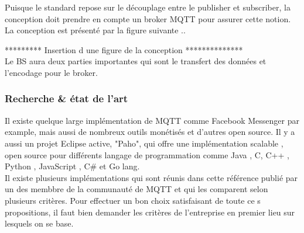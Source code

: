         Puisque le standard repose sur le découplage entre le publisher et subscriber, la conception doit prendre 
        en compte  un broker MQTT pour assurer cette notion. 
        La conception est présenté par la figure suivante .. 

 ********* Insertion d une figure de la conception ************** \\
        Le BS aura deux parties importantes qui sont le transfert des données et l'encodage pour le broker.

    \subsubsection{Recherche \& état de l'art}
            

        Il existe quelque large implémentation de MQTT comme Facebook Messenger par example, mais aussi de nombreux 
        outils monétisés et d'autres open source.
        Il y a aussi un projet Eclipse active, "Paho", qui offre une implémentation scalable , open source pour 
        différents langage de programmation comme Java , 
        C, C++ , Python , JavaScript , C\# et Go lang. \\
        Il existe plusieurs implémentations qui sont réunis dans cette référence \cite{mqtt_choix} publié par un des membbre de la communauté de MQTT et qui les comparent selon plusieurs critères. 
        Pour effectuer un bon choix satisfaisant de toute ce    s propositions, il faut bien demander les critères de l'entreprise en premier lieu 
        sur lesquels on se base. \\
        
